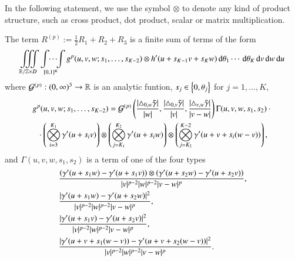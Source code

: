 In the following statement, we use the symbol $\otimes$ to
denote any kind of product structure, such as cross product, dot product,
scalar or matrix multiplication.

\begin{lemma}
 The term $R^{(p)} := \tfrac12R_1 + R_2 + R_3$ is a finite sum of terms of the form
 $$
  \iiint\limits_{\mathbb R / \mathbb Z \times D} \idotsint\limits_{[0,1]^K} g^p(u,v,w;s_{1},\dots,s_{K-2}) \otimes h'(u+s_{K-1}v + s_K w) 
  \,\mathrm{d}\theta_{1}\cdots\,\mathrm{d}\theta_{K}\,\mathrm{d} v \,\mathrm{d} w \,\mathrm{d} u
 $$
 where $\mathcal G^{(p)} : (0,\infty)^3 \rightarrow \mathbb R$ is an analytic funtion,
 $s_{j}\in\left\{0,\theta_{j}\right\}$ for $j=1,\dots,K$,
 \begin{multline*}
  g^p(u,v,w;s_{1},\dots,s_{K-2})=%
   \G \left(\frac{|\T 0w|}{|w|}, \frac{|\T 0v|}{|v|}, \frac{|\T vw|}{|v-w|}\right) 
  \Gamma(u,v,w,s_{1},s_{2})\cdot{}\\
  {}\cdot\left( \bigotimes_{i=3}^{K_1} \dg(u+ s_i v) \right) \otimes \left(\bigotimes_{j=K_1}^{K_2} \dg(u + s_i w) \right) \otimes \left(\bigotimes_{j=K_2}^{K-2} \dg(u+v + s_i (w-v)) \right),
 \end{multline*}
 and
 $\Gamma(u,v,w,s_{1},s_{2})$ is a term of one of the four types
 \begin{align*}
  &\frac{\left(\gamma'(u+s_1 w) - \gamma'(u+s_1 v)\right)\otimes\left(\gamma'(u+s_2 w) - \gamma'(u+s_2 v)\right)}{|v|^{p-2} |w|^{p-2} |v-w|^{p}}, \\
  &\frac{|\gamma'(u+s_1 w) - \gamma'(u+s_2 w)|^2}{|v|^{p-2} |w|^{p-2} |v-w|^{p}}, \\ 
  & \frac{|\gamma'(u+s_1 v) - \gamma'(u+s_2 v)|^2}{|v|^{p-2} |w|^{p-2} |v-w|^{p}}, \\ 
  & \frac{|\gamma'(u+v + s_1 (w-v)) - \gamma'(u+v+s_2 (w-v))|^2}{|v|^{p-2} |w|^{p-2} |v-w|^{p}}.
 \end{align*}
\end{lemma}

